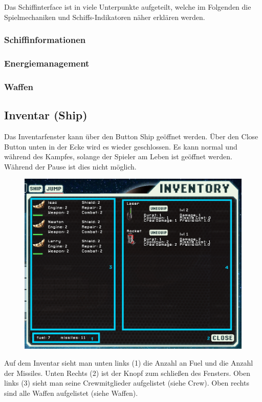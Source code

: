 \documentclass[fontsize=12pt,paper=a4,twoside]{scrartcl}
\begin{document}
Das Schiffinterface ist in viele Unterpunkte aufgeteilt, welche im Folgenden die Spielmechaniken und Schiffs-Indikatoren näher erklären werden.


\subsubsection{Schiffinformationen}



\subsubsection{Energiemanagement}


\subsubsection{Waffen}


\subsection{Inventar (Ship)}

Das Inventarfenster kann über den Button Ship geöffnet werden. Über den Close Button unten in der Ecke wird es wieder geschlossen. Es kann normal und während des Kampfes, solange der Spieler am Leben ist geöffnet werden. Während der Pause ist dies nicht möglich. 

\begin{figure}[H]
\centering
\includegraphics[width=0.8\linewidth]{DasSpiel/Inventar/inventar.png}
\end{figure} 

Auf dem Inventar sieht man unten links (1) die Anzahl an Fuel und die Anzahl der Missiles. Unten Rechts (2) ist der Knopf zum schließen des Fensters. Oben links (3) sieht man seine Crewmitglieder aufgelistet (siehe Crew). Oben rechts sind alle Waffen aufgelistet (siehe Waffen). 
\end{document}
